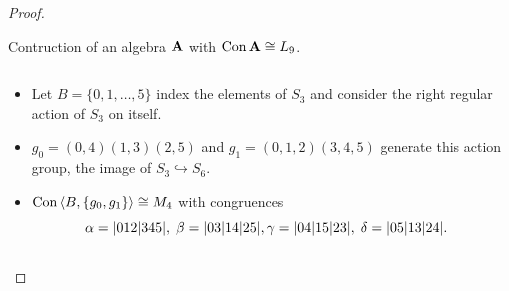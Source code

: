 \begin{proof}
\begin{frame}[fragile,label=freeseOLD,shrink=5]{Contruction of an algebra $\mathbf{A}$ with $\mathrm{Con\,} \mathbf{A} \cong L_9$.}
\begin{columns}
\begin{column}{0.8\textwidth}
\begin{enumerate}[Step 1]
        {\small
          \vskip4pt
          \begin{itemize}[label=$\cdot$]
          \item<4->
            Let $B = \{0, 1, \dots, 5\}$ index the elements of $S_3$ and
            consider the right regular action of $S_3$ on itself.
            \vskip5pt
          \item<4->
            $g_0 = (0,4)(1,3)(2,5)$ and $g_1 = (0,1,2)(3,4,5)$ generate this
            action group, the image of $S_3 \hookrightarrow S_6$.
            \vskip5pt
          \item<4-> $\mathrm{Con\,} \langle B , \{g_0, g_1\}\rangle \cong M_4$ with congruences
\vskip1pt
\[
\hskip-3mm            \alpha = | 0 1 2 | 3 4 5|, \; \beta = | 0 3 | 1 4 | 2 5 |, 
            \gamma = | 0 4|1 5| 2 3| , \; \delta = | 0 5|1 3| 2 4| .
            \]
          \end{itemize}
        }
      \end{enumerate}


    \end{column}
  \end{columns}

  \vskip-2mm

  \begin{columns}

    \begin{column}{0.2\textwidth}
      \begin{center}
      \end{center}
    \end{column}
    \begin{column}{0.75\textwidth}


\end{column}
\end{columns}
\end{frame}
\end{proof}
